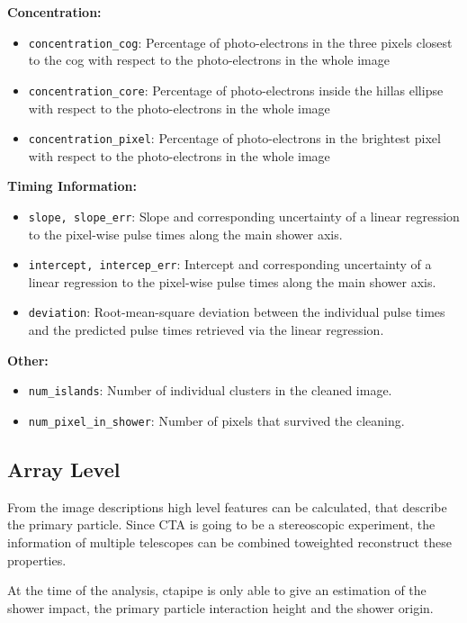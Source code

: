 \textbf{Concentration:}

\begin{itemize}
    \item{\texttt{concentration\_cog}: Percentage of photo-electrons in the three pixels closest to the cog with respect to the photo-electrons in the whole image}
    \item{\texttt{concentration\_core}: Percentage of photo-electrons inside the hillas ellipse with respect to the photo-electrons in the whole image}
    \item{\texttt{concentration\_pixel}: Percentage of photo-electrons in the brightest pixel with respect to the photo-electrons in the whole image}
\end{itemize}

\textbf{Timing Information:}

\begin{itemize}
    \item{\texttt{slope, slope\_err}: Slope and corresponding uncertainty of a linear regression to the pixel-wise pulse times along the main shower axis.}
    \item{\texttt{intercept, intercep\_err}: Intercept and corresponding uncertainty of a linear regression to the pixel-wise pulse times along the main shower axis.}
    \item{\texttt{deviation}: Root-mean-square deviation between the individual pulse times and the predicted pulse times
        retrieved via the linear regression.}
\end{itemize}

\textbf{Other:}

\begin{itemize}
    \item{\texttt{num\_islands}: Number of individual clusters in the cleaned image.}
    \item{\texttt{num\_pixel\_in\_shower}: Number of pixels that survived the cleaning.}
\end{itemize}


\subsection{Array Level}
From the image descriptions high level features can be calculated,
that describe the primary particle.
Since CTA is going to be a stereoscopic experiment,
the information of multiple telescopes can be combined toweighted
reconstruct these properties.

At the time of the analysis, ctapipe is only able to give an estimation
of the shower impact, the primary particle interaction height and
the shower origin.

